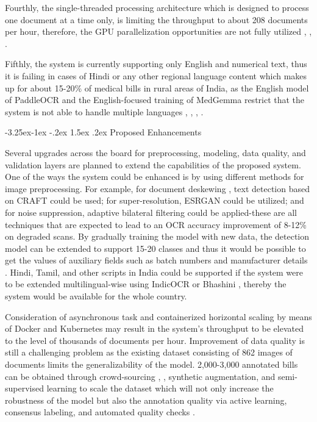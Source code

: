\documentclass[conference,twocolumn]{IEEEtran}
\makeatletter
\renewcommand{\subsection}{\@startsection{subsection}{2}{\z@}%
  {-3.25ex\@plus -1ex \@minus -.2ex}%
  {1.5ex \@plus .2ex}%
  {\normalfont\normalsize\bfseries\itshape}}
\makeatother
\begin{document}
Fourthly, the single-threaded processing architecture which is designed
to process one document at a time only, is limiting the throughput to
about 208 documents per hour, therefore, the GPU parallelization
opportunities are not fully utilized \cite{ref3}, \cite{ref4}, \cite{ref17}.

Fifthly, the system is currently supporting only English and numerical
text, thus it is failing in cases of Hindi or any other regional
language content which makes up for about 15-20\% of medical bills in
rural areas of India, as the English model of PaddleOCR and the
English-focused training of MedGemma restrict that the system is not
able to handle multiple languages \cite{ref4}, \cite{ref5}, \cite{ref10}, \cite{ref19}.

\subsection{Proposed Enhancements}

Several upgrades across the board for preprocessing, modeling, data quality, and
validation layers are planned to extend the capabilities of the proposed
system. One of the ways the system could be enhanced is by using
different methods for image preprocessing. For example, for document
deskewing \cite{ref2}, text detection based on CRAFT \cite{ref7} could be used;
for super-resolution, ESRGAN could be utilized; and for noise
suppression, adaptive bilateral filtering could be applied-these are all
techniques that are expected to lead to an OCR accuracy improvement of
8-12\% on degraded scans. By gradually training the model with new data,
the detection model can be extended to support 15-20 classes and thus it
would be possible to get the values of auxiliary fields such as batch
numbers and manufacturer details \cite{ref2}. Hindi, Tamil, and other
scripts in India could be supported if the system were to be extended
multilingual-wise using IndicOCR or Bhashini \cite{ref5}, thereby the system
would be available for the whole country.

Consideration of asynchronous task and containerized horizontal scaling
by means of Docker and Kubernetes may result in the
system's throughput to be elevated to the level of
thousands of documents per hour. Improvement of data quality is still a
challenging problem as the existing dataset consisting of 862 images of
documents limits the generalizability of the model. 2,000-3,000
annotated bills can be obtained through crowd-sourcing \cite{ref4}, \cite{ref5},
synthetic augmentation, and semi-supervised learning to scale the
dataset which will not only increase the robustness of the model but
also the annotation quality via active learning, consensus labeling, and
automated quality checks \cite{ref3}.
\end{document}

